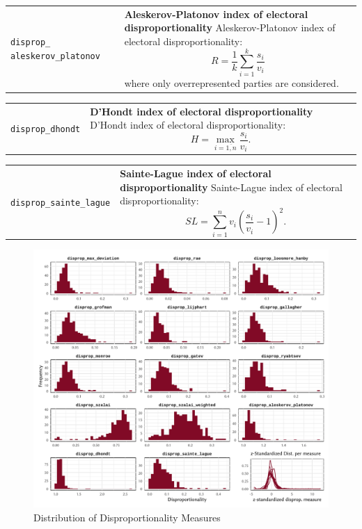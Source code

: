 \documentclass[
]{scrartcl}
\begin{document}
\begin{longtable}{p{3.2cm}| p{11cm}}
\texttt{disprop\_
aleskerov\_platonov} &\textbf{Aleskerov-Platonov index of electoral disproportionality}\newline 
Aleskerov-Platonov index of electoral disproportionality:
           \begin{equation}R = \frac{1}{k}\sum_{i=1}^{k}\frac{s_i}{v_i}\end{equation}
           where only overrepresented parties are considered.
\end{longtable}

\begin{longtable}{p{3.2cm}| p{11cm}}
\texttt{disprop\_dhondt} &\textbf{D'Hondt index of electoral disproportionality}\newline 
D'Hondt index of electoral disproportionality:
           \begin{equation}H = \max_{i=\overline{1,n}}\frac{s_i}{v_i}.\end{equation}
\end{longtable}

\begin{longtable}{p{3.2cm}| p{11cm}}
\texttt{disprop\_sainte\_lague} &\textbf{Sainte-Lague index of electoral disproportionality}\newline 
Sainte-Lague index of electoral disproportionality:
           \begin{equation}SL = \sum_{i=1}^{n}v_i\left(\frac{s_i}{v_i}-1\right)^2.\end{equation}
\end{longtable}

\begin{figure}

{\centering \includegraphics{cbfiles/unnamed-chunk-139-1} 

}

\caption{\label{fig:distdisp}Distribution of Disproportionality Measures}\label{fig:unnamed-chunk-139}
\end{figure}
\end{document}
